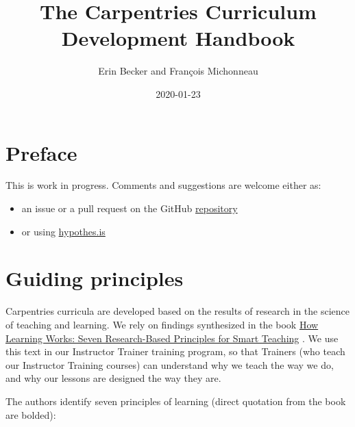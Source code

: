 \documentclass[]{book}
\title{The Carpentries Curriculum Development Handbook}
\author{Erin Becker and François Michonneau}
\date{2020-01-23}
\providecommand{\tightlist}{%
  \setlength{\itemsep}{0pt}\setlength{\parskip}{0pt}}
\begin{document}
\maketitle

{
\setcounter{tocdepth}{1}
\tableofcontents
}
\hypertarget{preface}{%
\chapter*{Preface}\label{preface}}

This is work in progress. Comments and suggestions are welcome either as:

\begin{itemize}
\tightlist
\item
  an issue or a pull request on the GitHub \href{https://github.com/carpentries/curriculum-development}{repository}
\item
  or using \href{https://web.hypothes.is/start/}{hypothes.is}
\end{itemize}

\hypertarget{guiding-principles}{%
\chapter{Guiding principles}\label{guiding-principles}}

Carpentries curricula are developed based on the results of research in the science of
teaching and learning. We rely on findings synthesized in the book
\href{https://www.wiley.com/en-us/How+Learning+Works\%3A+Seven+Research+Based+Principles+for+Smart+Teaching-p-9780470484104}{How Learning Works: Seven Research-Based Principles for Smart Teaching} \citep{ambrose2010learning}. We use this text in our Instructor Trainer training program, so that
Trainers (who teach our Instructor Training courses) can understand why we teach the way we
do, and why our lessons are designed the way they are.

The authors identify seven principles of learning (direct quotation from the book are bolded):
\end{document}
